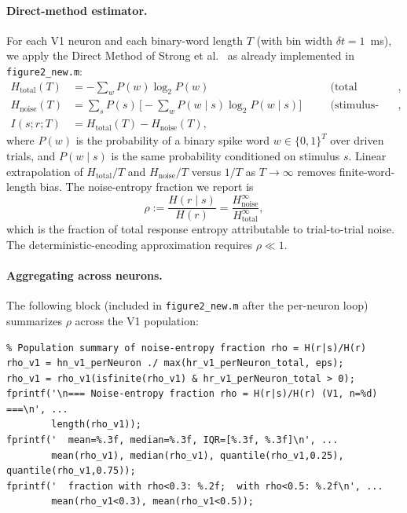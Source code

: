 \documentclass[11pt]{article}
\theoremstyle{remark}
\theoremstyle{definition}
\begin{document}
\paragraph{Direct-method estimator.}
For each V1 neuron and each binary-word length $T$ (with bin width $\delta t = 1$~ms), we apply the Direct Method of Strong et al.~\cite{strong1998entropy} as already implemented in \texttt{figure2\_new.m}:
\begin{align}
  H_{\mathrm{total}}(T) &= -\sum_{w} P(w)\log_2 P(w)
    \quad &&\text{(total response entropy across all driven trials)},\\
  H_{\mathrm{noise}}(T) &= \sum_{s} P(s)\,\Big[-\sum_{w} P(w\mid s)\log_2 P(w\mid s)\Big]
    \quad &&\text{(stimulus-conditional noise entropy)},\\
  I(s;r;T) &= H_{\mathrm{total}}(T) - H_{\mathrm{noise}}(T),
\end{align}
where $P(w)$ is the probability of a binary spike word $w\in\{0,1\}^T$ over driven trials, and $P(w\mid s)$ is the same probability conditioned on stimulus $s$.  Linear extrapolation of $H_{\mathrm{total}}/T$ and $H_{\mathrm{noise}}/T$ versus $1/T$ as $T\to\infty$ removes finite-word-length bias.  The noise-entropy fraction we report is
\begin{equation}
  \rho := \frac{H(r\mid s)}{H(r)}
        = \frac{H_{\mathrm{noise}}^{\infty}}{H_{\mathrm{total}}^{\infty}},
  \label{eq:noise-fraction}
\end{equation}
which is the fraction of total response entropy attributable to trial-to-trial noise.  The deterministic-encoding approximation requires $\rho \ll 1$.

\paragraph{Aggregating across neurons.}
The following block (included in \texttt{figure2\_new.m} after the per-neuron loop) summarizes $\rho$ across the V1 population:
\begin{verbatim}
% Population summary of noise-entropy fraction rho = H(r|s)/H(r)
rho_v1 = hn_v1_perNeuron ./ max(hr_v1_perNeuron_total, eps);
rho_v1 = rho_v1(isfinite(rho_v1) & hr_v1_perNeuron_total > 0);
fprintf('\n=== Noise-entropy fraction rho = H(r|s)/H(r) (V1, n=%d) ===\n', ...
        length(rho_v1));
fprintf('  mean=%.3f, median=%.3f, IQR=[%.3f, %.3f]\n', ...
        mean(rho_v1), median(rho_v1), quantile(rho_v1,0.25), quantile(rho_v1,0.75));
fprintf('  fraction with rho<0.3: %.2f;  with rho<0.5: %.2f\n', ...
        mean(rho_v1<0.3), mean(rho_v1<0.5));
\end{verbatim}
\end{document}

